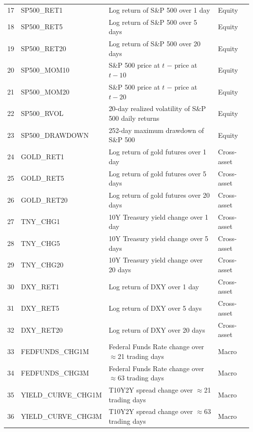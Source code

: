 \documentclass[12pt]{article}
\begin{document}
\begin{table}[H]
\begin{tabular}{llll}
\midrule
17 & SP500\_RET1       & Log return of S\&P 500 over 1 day                          & Equity \\
18 & SP500\_RET5       & Log return of S\&P 500 over 5 days                         & Equity \\
19 & SP500\_RET20      & Log return of S\&P 500 over 20 days                        & Equity \\
20 & SP500\_MOM10      & S\&P 500 price at $t$ $-$ price at $t-10$                  & Equity \\
21 & SP500\_MOM20      & S\&P 500 price at $t$ $-$ price at $t-20$                  & Equity \\
22 & SP500\_RVOL       & 20-day realized volatility of S\&P 500 daily returns        & Equity \\
23 & SP500\_DRAWDOWN   & 252-day maximum drawdown of S\&P 500                       & Equity \\
\midrule
24 & GOLD\_RET1        & Log return of gold futures over 1 day                      & Cross-asset \\
25 & GOLD\_RET5        & Log return of gold futures over 5 days                     & Cross-asset \\
26 & GOLD\_RET20       & Log return of gold futures over 20 days                    & Cross-asset \\
27 & TNY\_CHG1         & 10Y Treasury yield change over 1 day                       & Cross-asset \\
28 & TNY\_CHG5         & 10Y Treasury yield change over 5 days                      & Cross-asset \\
29 & TNY\_CHG20        & 10Y Treasury yield change over 20 days                     & Cross-asset \\
30 & DXY\_RET1         & Log return of DXY over 1 day                               & Cross-asset \\
31 & DXY\_RET5         & Log return of DXY over 5 days                              & Cross-asset \\
32 & DXY\_RET20        & Log return of DXY over 20 days                             & Cross-asset \\
\midrule
33 & FEDFUNDS\_CHG1M   & Federal Funds Rate change over $\approx$21 trading days    & Macro \\
34 & FEDFUNDS\_CHG3M   & Federal Funds Rate change over $\approx$63 trading days    & Macro \\
35 & YIELD\_CURVE\_CHG1M & T10Y2Y spread change over $\approx$21 trading days        & Macro \\
36 & YIELD\_CURVE\_CHG3M & T10Y2Y spread change over $\approx$63 trading days        & Macro \\
\bottomrule
\end{tabular}
\end{table}
\end{document}
